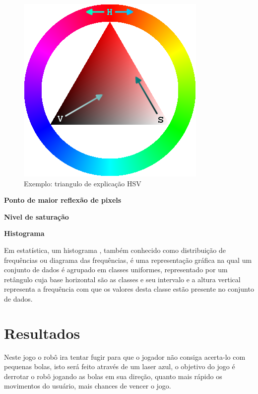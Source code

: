 \documentclass{sciposter}
\begin{document}
\begin{multicols}{3}
\begin{figure}[!htb]
\centering
\includegraphics[scale=0.7]{Triangulo_HSV.png}
\caption{Exemplo: triangulo de explicação HSV }
\end{figure}

\textbf{Ponto de maior reflexão de pixels}

\textbf{Nivel de saturação}
 
\textbf{Histograma}

Em estatística, um histograma , também conhecido como distribuição de frequências ou diagrama das frequências, é uma representação gráfica na qual um conjunto de dados é agrupado em classes uniformes, representado por um retângulo cuja base horizontal são as classes e seu intervalo e a altura vertical representa a frequência com que os valores desta classe estão presente no conjunto de dados.

\section{Resultados }

Neste jogo o robô ira tentar fugir para que o jogador não consiga acerta-lo com pequenas bolas, 
isto será feito através de um laser azul, o objetivo do jogo é derrotar o robô jogando as bolas em sua direção, quanto mais rápido os movimentos do usuário, mais chances de vencer o jogo.

\vspace{0.7cm}


\end{multicols}
\end{document}
